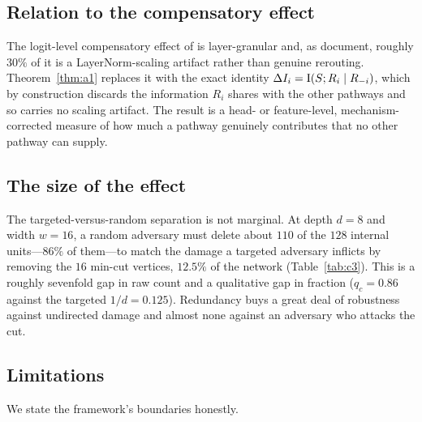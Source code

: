 \subsection{Relation to the compensatory effect}

The logit-level compensatory effect of \cite{mcgrath2023hydra} is layer-granular and,
as \cite{rushing2024selfrepair} document, roughly $30\%$ of it is a LayerNorm-scaling
artifact rather than genuine rerouting. Theorem~\ref{thm:a1} replaces it with the exact
identity $\Delta I_i=\operatorname{I}(S;R_i\mid R_{-i})$, which by construction discards the
information $R_i$ shares with the other pathways and so carries no scaling artifact.
The result is a head- or feature-level, mechanism-corrected measure of how much a
pathway genuinely contributes that no other pathway can supply.

\subsection{The size of the effect}

The targeted-versus-random separation is not marginal. At depth $d=8$ and width
$w=16$, a random adversary must delete about $110$ of the $128$ internal units---$86\%$
of them---to match the damage a targeted adversary inflicts by removing the $16$
min-cut vertices, $12.5\%$ of the network (Table~\ref{tab:c3}). This is a roughly
sevenfold gap in raw count and a qualitative gap in fraction ($q_c=0.86$ against the
targeted $1/d=0.125$). Redundancy buys a great deal of robustness against
undirected damage and almost none against an adversary who attacks the cut.

\subsection{Limitations}

We state the framework's boundaries honestly.

